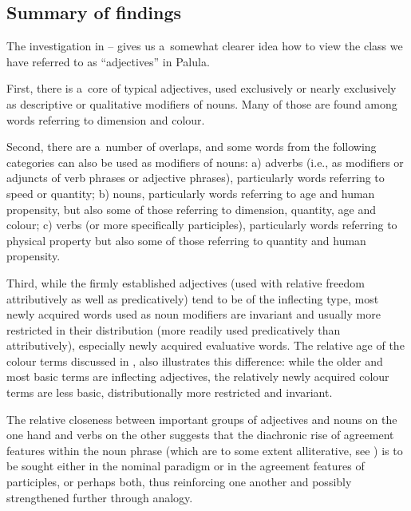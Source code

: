 \subsection{Summary of findings}
\label{subsec:6-2-9}

The investigation in -- gives us a~somewhat clearer idea how to view the class we have referred to as ``adjectives'' in Palula. 



First, there is a~core of typical adjectives, used exclusively or nearly exclusively as descriptive or qualitative modifiers of nouns. Many of those are found among words referring to dimension and colour. 


\largerpage
Second, there are a~number of overlaps, and some words from the following categories can also be used as modifiers of nouns: a) adverbs (i.e., as modifiers or adjuncts of verb phrases or adjective phrases), particularly words referring to speed or quantity; b) nouns, particularly words referring to age and human propensity, but also some of those referring to dimension, quantity, age and colour; c) verbs (or more specifically participles), particularly words referring to physical property but also some of those referring to quantity and human propensity.



Third, while the firmly established adjectives (used with relative freedom attributively as well as predicatively) tend to be of the inflecting type, most newly acquired words used as noun modifiers are invariant and usually more restricted in their distribution (more readily used predicatively than attributively), especially newly acquired evaluative words. The relative age of the colour terms discussed in , also illustrates this difference: while the older and most basic terms are inflecting adjectives, the relatively newly acquired colour terms are less basic, distributionally more restricted and invariant.



The relative closeness between important groups of adjectives and nouns on the one hand and verbs on the other suggests that the diachronic rise of agreement features within the noun phrase (which are to some extent alliterative, see \citealt[87]{corbett2006}) is to be sought either in the nominal paradigm or in the agreement features of participles, or perhaps both, thus reinforcing one another and possibly strengthened further through analogy.


